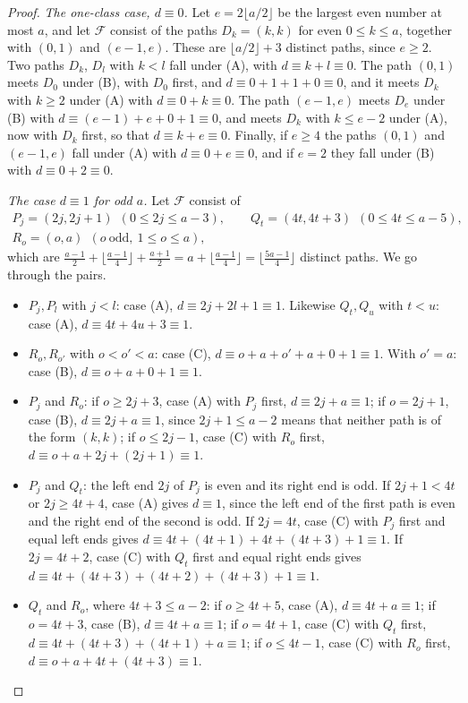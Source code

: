 \documentclass[11pt]{amsart}
\theoremstyle{definition}
\theoremstyle{remark}
\numberwithin{equation}{section}
\newcommand{\cF}{\mathcal{F}}
\begin{document}
\begin{proof}
\emph{The one-class case, $d\equiv0$.} Let $e=2\lfloor a/2\rfloor$ be the largest even number at most $a$, and let $\cF$ consist of the paths $D_k=(k,k)$ for even $0\le k\le a$, together with $(0,1)$ and $(e-1,e)$. These are $\lfloor a/2\rfloor+3$ distinct paths, since $e\ge2$. Two paths $D_k$, $D_l$ with $k<l$ fall under (A), with $d\equiv k+l\equiv0$. The path $(0,1)$ meets $D_0$ under (B), with $D_0$ first, and $d\equiv0+1+1+0\equiv0$, and it meets $D_k$ with $k\ge2$ under (A) with $d\equiv0+k\equiv0$. The path $(e-1,e)$ meets $D_e$ under (B) with $d\equiv(e-1)+e+0+1\equiv0$, and meets $D_k$ with $k\le e-2$ under (A), now with $D_k$ first, so that $d\equiv k+e\equiv0$. Finally, if $e\ge4$ the paths $(0,1)$ and $(e-1,e)$ fall under (A) with $d\equiv0+e\equiv0$, and if $e=2$ they fall under (B) with $d\equiv0+2\equiv0$.

\emph{The case $d\equiv1$ for odd $a$.} Let $\cF$ consist of
\[
\begin{gathered}
P_j=(2j,2j+1)\ \ (0\le 2j\le a-3),\qquad Q_t=(4t,4t+3)\ \ (0\le 4t\le a-5),\\
R_o=(o,a)\ \ (o\ \text{odd},\ 1\le o\le a),
\end{gathered}
\]
which are $\frac{a-1}2+\lfloor\frac{a-1}4\rfloor+\frac{a+1}2=a+\lfloor\frac{a-1}4\rfloor=\lfloor\frac{5a-1}4\rfloor$ distinct paths. We go through the pairs.
\begin{itemize}
\item $P_j,P_l$ with $j<l$: case (A), $d\equiv 2j+2l+1\equiv1$. Likewise $Q_t,Q_u$ with $t<u$: case (A), $d\equiv4t+4u+3\equiv1$.
\item $R_o,R_{o'}$ with $o<o'<a$: case (C), $d\equiv o+a+o'+a+0+1\equiv1$. With $o'=a$: case (B), $d\equiv o+a+0+1\equiv1$.
\item $P_j$ and $R_o$: if $o\ge2j+3$, case (A) with $P_j$ first, $d\equiv2j+a\equiv1$; if $o=2j+1$, case (B), $d\equiv2j+a\equiv1$, since $2j+1\le a-2$ means that neither path is of the form $(k,k)$; if $o\le2j-1$, case (C) with $R_o$ first, $d\equiv o+a+2j+(2j+1)\equiv1$.
\item $P_j$ and $Q_t$: the left end $2j$ of $P_j$ is even and its right end is odd. If $2j+1<4t$ or $2j\ge4t+4$, case (A) gives $d\equiv1$, since the left end of the first path is even and the right end of the second is odd. If $2j=4t$, case (C) with $P_j$ first and equal left ends gives $d\equiv 4t+(4t+1)+4t+(4t+3)+1\equiv1$. If $2j=4t+2$, case (C) with $Q_t$ first and equal right ends gives $d\equiv4t+(4t+3)+(4t+2)+(4t+3)+1\equiv1$.
\item $Q_t$ and $R_o$, where $4t+3\le a-2$: if $o\ge4t+5$, case (A), $d\equiv4t+a\equiv1$; if $o=4t+3$, case (B), $d\equiv 4t+a\equiv1$; if $o=4t+1$, case (C) with $Q_t$ first, $d\equiv4t+(4t+3)+(4t+1)+a\equiv1$; if $o\le4t-1$, case (C) with $R_o$ first, $d\equiv o+a+4t+(4t+3)\equiv1$.
\end{itemize}


\end{proof}
\end{document}
